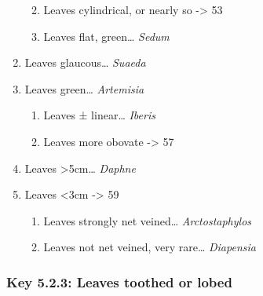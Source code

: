 \documentclass[openany]{book}
\providecommand{\tightlist}{%
  \setlength{\itemsep}{0pt}\setlength{\parskip}{0pt}}
\begin{document}
\begin{enumerate}
  \begin{enumerate}
  \def\labelenumii{\arabic{enumii}.}
  \setcounter{enumii}{50}
  \tightlist
  \item
    Leaves cylindrical, or nearly so -\textgreater{} 53
  \item
    Leaves flat, green\ldots{} \emph{Sedum}
  \end{enumerate}
\item
  Leaves glaucous\ldots{} \emph{Suaeda}
\item
  Leaves green\ldots{} \emph{Artemisia}

  \begin{enumerate}
  \def\labelenumii{\arabic{enumii}.}
  \setcounter{enumii}{54}
  \tightlist
  \item
    Leaves ± linear\ldots{} \emph{Iberis}
  \item
    Leaves more obovate -\textgreater{} 57
  \end{enumerate}
\item
  Leaves \textgreater{}5cm\ldots{} \emph{Daphne}
\item
  Leaves \textless{}3cm -\textgreater{} 59

  \begin{enumerate}
  \def\labelenumii{\arabic{enumii}.}
  \setcounter{enumii}{58}
  \tightlist
  \item
    Leaves strongly net veined\ldots{} \emph{Arctostaphylos}
  \item
    Leaves not net veined, very rare\ldots{} \emph{Diapensia}
  \end{enumerate}
\end{enumerate}

\hypertarget{key-5.2.3-leaves-toothed-or-lobed}{%
\subsubsection{Key 5.2.3: Leaves toothed or
lobed}\label{key-5.2.3-leaves-toothed-or-lobed}}
\end{document}
